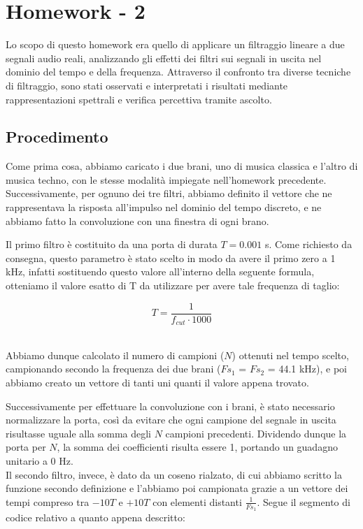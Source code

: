 \documentclass[../main.tex]{subfiles}
\begin{document}
\clearpage
\thispagestyle{empty}
\vspace*{7cm}
\section{Homework - 2}
\vspace*{1.5cm}

Lo scopo di questo homework era quello di applicare un filtraggio lineare a due segnali audio reali, analizzando gli effetti dei filtri sui segnali in uscita nel dominio del tempo e della frequenza. Attraverso il confronto tra diverse tecniche di filtraggio, sono stati osservati e interpretati i risultati mediante rappresentazioni spettrali e verifica percettiva tramite ascolto.

\subsection{Procedimento}

Come prima cosa, abbiamo caricato i due brani, uno di musica classica e l’altro di musica techno, con le stesse modalità impiegate nell’homework precedente. 
Successivamente, per ognuno dei tre filtri, abbiamo definito il vettore che ne rappresentava la risposta all’impulso nel dominio del tempo discreto, e ne abbiamo fatto la convoluzione con una finestra di ogni brano.

Il primo filtro è costituito da una porta di durata $ T = 0.001$ s. Come richiesto da consegna, questo parametro è stato scelto in modo da avere il primo zero a 1 kHz, infatti sostituendo questo valore all’interno della seguente formula, otteniamo il valore esatto di T da utilizzare per avere tale frequenza di taglio: 

\[ T = \frac{1}{f_{cut} \cdot 1000} \]\

Abbiamo dunque calcolato il numero di campioni ($N$) ottenuti nel tempo scelto, campionando secondo la frequenza dei due brani ($Fs_1$ = $Fs_2$ = 44.1 kHz), e poi abbiamo creato un vettore di tanti uni quanti il valore appena trovato. 

Successivamente per effettuare la convoluzione con i brani, è stato necessario normalizzare la porta, così da evitare che ogni campione del segnale in uscita risultasse uguale alla somma degli $N$ campioni precedenti. Dividendo dunque la porta per $N$, la somma dei coefficienti risulta essere 1, portando un guadagno unitario a 0 Hz.\\

Il secondo filtro, invece, è dato da un coseno rialzato, di cui abbiamo scritto la funzione secondo definizione e l'abbiamo poi campionata grazie a un vettore dei tempi compreso tra $-10T$ e $+10T$ con elementi distanti $\tfrac{1}{Fs_1}$. Segue il segmento di codice relativo a quanto appena descritto:
\end{document}
